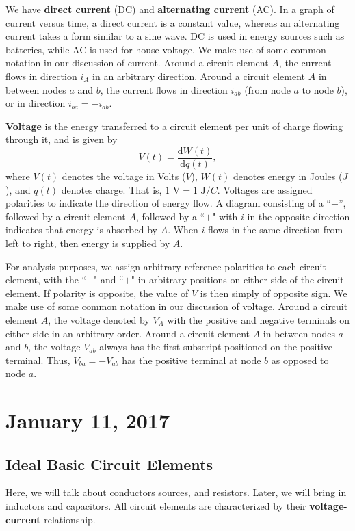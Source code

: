 \documentclass[11pt]{article}
\theoremstyle{plain} %
\theoremstyle{definition}
\theoremstyle{example}
\theoremstyle{remark}
\begin{document}
We have \textbf{direct current} (DC) and \textbf{alternating current} (AC). In a graph of current versus time, a direct current is a constant value, whereas an alternating current takes a form similar to a sine wave. DC is used in energy sources such as batteries, while AC is used for house voltage. We make use of some common notation in our discussion of current. Around a circuit element $A$, the current flows in direction $i_A$ in an arbitrary direction. Around a circuit element $A$ in between nodes $a$ and $b$, the current flows in direction $i_{ab}$ (from node $a$ to node $b$), or in direction $i_{ba} = -i_{ab}$.

\textbf{Voltage} is the energy transferred to a circuit element per unit of charge flowing through it, and is given by 
$$V(t) = \frac{\mathrm d W(t)}{\mathrm d q(t)},$$
where $V(t)$ denotes the voltage in Volts ($V$), $W(t)$ denotes energy in Joules ($J$), and $q(t)$ denotes charge. That is, $1 \text{ V} = 1 \text{ J}/C$. Voltages are assigned polarities to indicate the direction of energy flow. A diagram consisting of a ``$-$'', followed by a circuit element $A$, followed by a ``$+$" with $i$ in the opposite direction indicates that energy is absorbed by $A$. When $i$ flows in the same direction from left to right, then energy is supplied by $A$. 

For analysis purposes, we assign arbitrary reference polarities to each circuit element, with the ``$-$" and ``$+$" in arbitrary positions on either side of the circuit element. If polarity is opposite, the value of $V$ is then simply of opposite sign. We make use of some common notation in our discussion of voltage. Around a circuit element $A$, the voltage denoted by $V_A$ with the positive and negative terminals on either side in an arbitrary order. Around a circuit element $A$ in between nodes $a$ and $b$, the voltage $V_{ab}$ always has the first subscript positioned on the positive terminal. Thus, $V_{ba} = -V_{ab}$ has the positive terminal at node $b$ as opposed to node $a$. 

\section{January 11, 2017}
\subsection{Ideal Basic Circuit Elements}

Here, we will talk about conductors sources, and resistors. Later, we will bring in inductors and capacitors. All circuit elements are characterized by their \textbf{voltage-current} relationship. 
\end{document}
